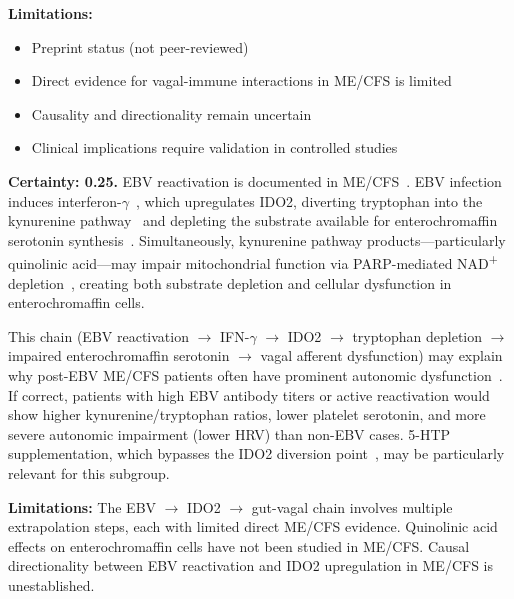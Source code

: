 \begin{speculation}
\textbf{Limitations:}
\begin{itemize}
    \item Preprint status (not peer-reviewed)
    \item Direct evidence for vagal-immune interactions in ME/CFS is limited
    \item Causality and directionality remain uncertain
    \item Clinical implications require validation in controlled studies
\end{itemize}
\end{speculation}

\begin{speculation}
\label{spec:ebv-ido2-gut-vagal}
\textbf{Certainty: 0.25.} EBV reactivation is documented in ME/CFS~\cite{hwang2023viral}. EBV infection induces interferon-$\gamma$~\cite{Huang2020IDO}, which upregulates IDO2, diverting tryptophan into the kynurenine pathway~\cite{phair2019ido, WirthScheibenbogen2025Neurotransmitter} and depleting the substrate available for enterochromaffin serotonin synthesis~\cite{Barton2025}. Simultaneously, kynurenine pathway products---particularly quinolinic acid---may impair mitochondrial function via PARP-mediated NAD\textsuperscript{+} depletion~\cite{Kavyani2022kynurenine, Dehhaghi2022kynurenine, Dehhaghi2022AD}, creating both substrate depletion and cellular dysfunction in enterochromaffin cells.

This chain (EBV reactivation $\to$ IFN-$\gamma$ $\to$ IDO2 $\to$ tryptophan depletion $\to$ impaired enterochromaffin serotonin $\to$ vagal afferent dysfunction) may explain why post-EBV ME/CFS patients often have prominent autonomic dysfunction~\cite{hwang2023viral}. If correct, patients with high EBV antibody titers or active reactivation would show higher kynurenine/tryptophan ratios, lower platelet serotonin, and more severe autonomic impairment (lower HRV) than non-EBV cases. 5-HTP supplementation, which bypasses the IDO2 diversion point~\cite{WirthScheibenbogen2025Neurotransmitter}, may be particularly relevant for this subgroup.

\textbf{Limitations:} The EBV $\to$ IDO2 $\to$ gut-vagal chain involves multiple extrapolation steps, each with limited direct ME/CFS evidence. Quinolinic acid effects on enterochromaffin cells have not been studied in ME/CFS. Causal directionality between EBV reactivation and IDO2 upregulation in ME/CFS is unestablished.
\end{speculation}

